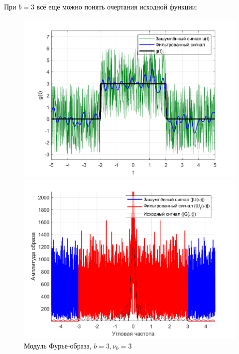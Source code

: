 \documentclass[a4paper]{article}
\begin{document}
При $b = 3$ всё ещё можно понять очертания исходной функции:

\begin{figure}[H]
    \begin{minipage}{0.5\textwidth}
        \centering
        \includegraphics[width=\textwidth]{part1/3_3.png}
        \caption{$b=3, \nu_0 = 3$}
    \end{minipage}    
    \begin{minipage}{0.5\textwidth}
        \centering
        \includegraphics[width=\textwidth]{part1/3_3_Fourier.png}
        \caption{Модуль Фурье-образа, $b=3, \nu_0 = 3$}
    \end{minipage}
\end{figure}\
\end{document}
